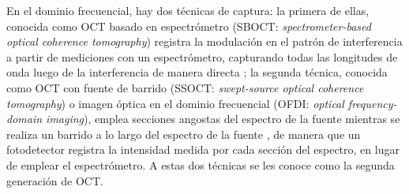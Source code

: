 En el dominio frecuencial, hay dos técnicas de captura: la primera de ellas, conocida como OCT basado en espectrómetro (SBOCT: \textit{spectrometer-based optical coherence tomography}) registra la modulación en el patrón de interferencia a partir de mediciones con un espectrómetro, capturando todas las longitudes de onda luego de la interferencia de manera directa \cite{Wojtkowski2004, Nassif2004}; la segunda técnica, conocida como OCT con fuente de barrido (SSOCT: \textit{swept-source optical coherence tomography}) o imagen óptica en el dominio frecuencial (OFDI: \textit{optical frequency-domain imaging}), emplea secciones angostas del espectro de la fuente mientras se realiza un barrido a lo largo del espectro de la fuente \cite{Yun2003, Choma2003}, de manera que un fotodetector registra la intensidad medida por cada sección del espectro, en lugar de emplear el espectrómetro. A estas dos técnicas se les conoce como la segunda generación de OCT.

%


